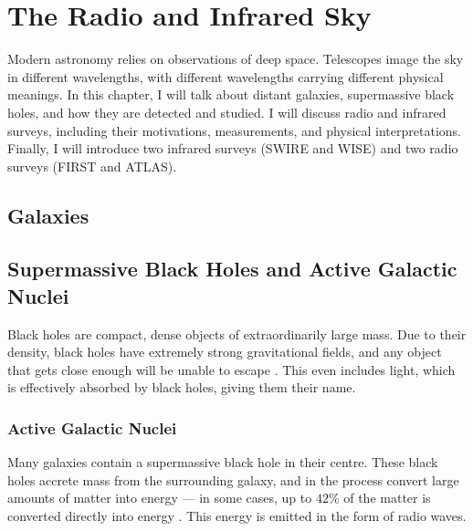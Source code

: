 \chapter{The Radio and Infrared Sky}
\label{cha:astro}

    Modern astronomy relies on observations of deep space. Telescopes image the sky in different wavelengths, with different wavelengths carrying different physical meanings. In this chapter, I will talk about distant galaxies, supermassive black holes, and how they are detected and studied. I will discuss radio and infrared surveys, including their motivations, measurements, and physical interpretations. Finally, I will introduce two infrared surveys (SWIRE and WISE) and two radio surveys (FIRST and ATLAS).

    \section{Galaxies}



    \section{Supermassive Black Holes and Active Galactic Nuclei}

        Black holes are compact, dense objects of extraordinarily large mass. Due to their density, black holes have extremely strong gravitational fields, and any object that gets close enough will be unable to escape \citep{wald10}. This even includes light, which is effectively absorbed by black holes, giving them their name.




        \subsection{Active Galactic Nuclei}

            Many galaxies contain a supermassive black hole in their centre. These black holes accrete mass from the surrounding galaxy, and in the process convert large amounts of matter into energy --- in some cases, up to $42\%$ of the matter is converted directly into energy \citep{alexander12}. This energy is emitted in the form of radio waves.

